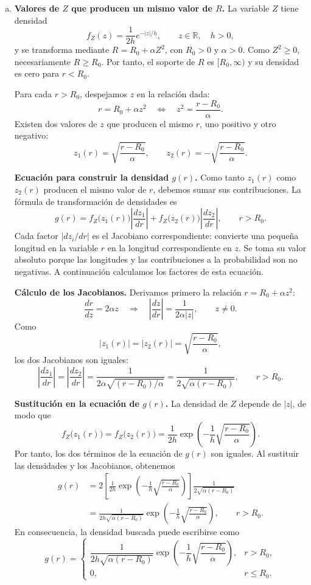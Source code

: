 \documentclass[a4paper]{article}
\begin{document}
\begin{enumerate}[a.]
\item \textbf{Valores de $Z$ que producen un mismo valor de $R$.}
La variable $Z$ tiene densidad
$$
f_Z(z)=\frac{1}{2h}e^{-|z|/h},\qquad z\in\mathbb{R},\quad h>0,
$$
y se transforma mediante $R=R_0+\alpha Z^2$, con $R_0>0$ y $\alpha>0$. Como $Z^2\ge0$, necesariamente $R\ge R_0$. Por tanto, el soporte de $R$ es $[R_0,\infty)$ y su densidad es cero para $r<R_0$.

Para cada $r>R_0$, despejamos $z$ en la relación dada:
$$
r=R_0+\alpha z^2
\quad\Longleftrightarrow\quad
z^2=\frac{r-R_0}{\alpha}.
$$
Existen dos valores de $z$ que producen el mismo $r$, uno positivo y otro negativo:
$$
z_1(r)=\sqrt{\frac{r-R_0}{\alpha}},
\qquad
z_2(r)=-\sqrt{\frac{r-R_0}{\alpha}}.
$$



\textbf{Ecuación para construir la densidad $g(r)$.}
Como tanto $z_1(r)$ como $z_2(r)$ producen el mismo valor de $r$, debemos sumar sus contribuciones. La fórmula de transformación de densidades es
$$
\boxed{
g(r)=f_Z\bigl(z_1(r)\bigr)\left|\frac{dz_1}{dr}\right|
     +f_Z\bigl(z_2(r)\bigr)\left|\frac{dz_2}{dr}\right|,
\qquad r>R_0.}
$$
Cada factor $|dz_i/dr|$ es el Jacobiano correspondiente: convierte una pequeña longitud en la variable $r$ en la longitud correspondiente en $z$. Se toma su valor absoluto porque las longitudes y las contribuciones a la probabilidad son no negativas. A continuación calculamos los factores de esta ecuación.

\textbf{Cálculo de los Jacobianos.}
Derivamos primero la relación $r=R_0+\alpha z^2$:
$$
\frac{dr}{dz}=2\alpha z
\quad\Longrightarrow\quad
\left|\frac{dz}{dr}\right|=\frac{1}{2\alpha|z|},
\qquad z\ne0.
$$
Como
$$
|z_1(r)|=|z_2(r)|=\sqrt{\frac{r-R_0}{\alpha}},
$$
los dos Jacobianos son iguales:
$$
\left|\frac{dz_1}{dr}\right|
=\left|\frac{dz_2}{dr}\right|
=\frac{1}{2\alpha\sqrt{(r-R_0)/\alpha}}
=\frac{1}{2\sqrt{\alpha(r-R_0)}},
\qquad r>R_0.
$$

\textbf{Sustitución en la ecuación de $g(r)$.}
La densidad de $Z$ depende de $|z|$, de modo que
$$
f_Z\bigl(z_1(r)\bigr)=f_Z\bigl(z_2(r)\bigr)
=\frac{1}{2h}\exp\!\left(-\frac{1}{h}\sqrt{\frac{r-R_0}{\alpha}}\right).
$$
Por tanto, los dos términos de la ecuación de $g(r)$ son iguales. Al sustituir las densidades y los Jacobianos, obtenemos
\begin{align*}
g(r)
&=2\left[\frac{1}{2h}\exp\!\left(-\frac{1}{h}\sqrt{\frac{r-R_0}{\alpha}}\right)\right]
  \frac{1}{2\sqrt{\alpha(r-R_0)}}\\
&=\frac{1}{2h\sqrt{\alpha(r-R_0)}}
  \exp\!\left(-\frac{1}{h}\sqrt{\frac{r-R_0}{\alpha}}\right),
\qquad r>R_0.
\end{align*}
En consecuencia, la densidad buscada puede escribirse como
$$
\boxed{
g(r)=
\begin{cases}
\dfrac{1}{2h\sqrt{\alpha(r-R_0)}}
\exp\!\left(-\dfrac{1}{h}\sqrt{\dfrac{r-R_0}{\alpha}}\right), & r>R_0,\\[4mm]
0, & r\le R_0.
\end{cases}}
$$


\end{enumerate}
\end{document}
